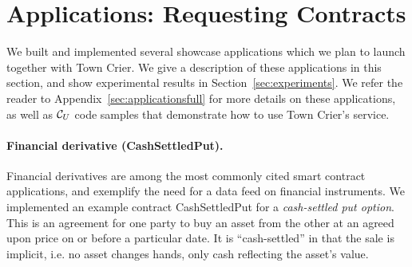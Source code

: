 \section{Applications: Requesting Contracts}
\label{sec:applications}

We built and implemented several showcase applications which we plan
to launch together with Town Crier.
We give a description of these applications in this section,
and show experimental results in Section~\ref{sec:experiments}.
We refer the reader to Appendix~\ref{sec:applicationsfull}
for more details on these applications,
as well as ${\cal C}_U$ code samples that demonstrate
how to use Town Crier's service.


\paragraph{Financial derivative ({\sf CashSettledPut}).}
Financial derivatives are among the most commonly cited smart contract
applications,
and exemplify the need for a data feed on financial instruments.
We implemented an example contract {\sf CashSettledPut} for a {\em cash-settled put option}.
This is an agreement for one party to buy an asset from the other at an agreed upon price on or before a particular date.
It is ``cash-settled'' in that the sale is implicit, i.e. no asset changes hands, only cash reflecting the asset's value.
%
\iffalse

